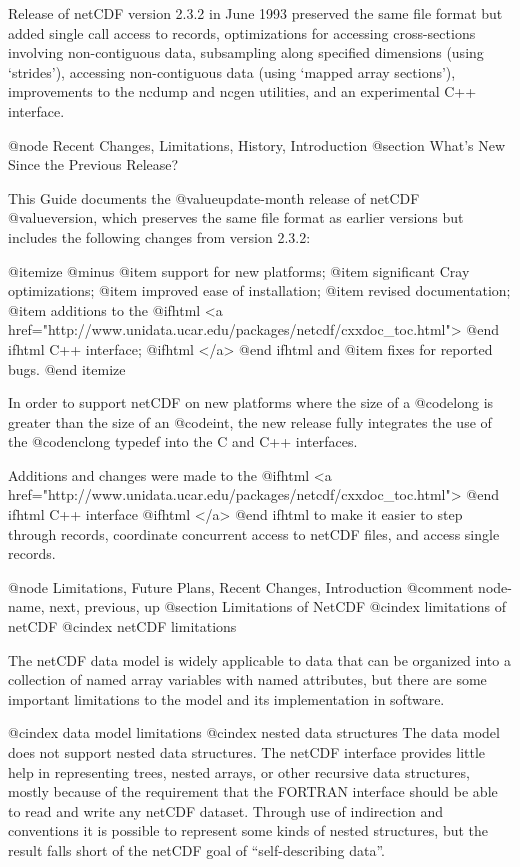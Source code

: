 Release of netCDF version 2.3.2 in June 1993 preserved the same file
format but added
single call access to records,
optimizations for accessing cross-sections involving non-contiguous data,
subsampling along specified dimensions (using `strides'),
accessing non-contiguous data (using `mapped array sections'),
improvements to the ncdump and ncgen utilities, and
an experimental C++ interface.

@node Recent Changes, Limitations, History, Introduction
@section What's New Since the Previous Release?

This Guide documents the @value{update-month} release of netCDF
@value{version}, which preserves the same file format as earlier
versions but
includes the following changes from version 2.3.2:

@itemize @minus
@item
support for new platforms;
@item
significant Cray optimizations;
@item
improved ease of installation;
@item
revised documentation;
@item
additions to the 
@ifhtml
<a href="http://www.unidata.ucar.edu/packages/netcdf/cxxdoc_toc.html">
@end ifhtml
C++ interface;
@ifhtml
</a>
@end ifhtml
and
@item
fixes for reported bugs.
@end itemize

In order to support netCDF on new platforms where the size of a
@code{long} is greater than the size of an @code{int}, the new release
fully integrates the use of the @code{nclong} typedef into the C and C++
interfaces.

Additions and changes were made to the 
@ifhtml
<a href="http://www.unidata.ucar.edu/packages/netcdf/cxxdoc_toc.html">
@end ifhtml
C++ interface 
@ifhtml
</a>
@end ifhtml
to make it easier
to step through records, coordinate concurrent access to netCDF files,
and access single records.

@node Limitations, Future Plans, Recent Changes, Introduction
@comment  node-name,  next,  previous,  up
@section Limitations of NetCDF
@cindex limitations of netCDF
@cindex netCDF limitations

The netCDF data model is widely applicable to data that can
be organized into a collection of named
array variables with named attributes, but there are some important
limitations to the model and its implementation in software.

@cindex data model limitations
@cindex nested data structures
The data model does not support nested data
structures.  The netCDF interface provides little help in representing
trees, nested arrays, or other recursive data structures, mostly because
of the requirement that the FORTRAN interface should be able to read and
write any netCDF dataset.
Through use of indirection and conventions it is possible to represent
some kinds of nested structures, but the result falls short of the
netCDF goal of ``self-describing data''.

